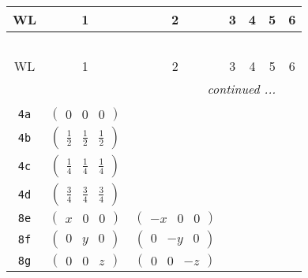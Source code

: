 \documentclass[fleqn,9pt,landscape]{jsarticle}
\begin{document}
\begin{center}
\renewcommand{\arraystretch}{1.2}
\begin{longtable}{ccccccc}
 \hline \hline
WL & 1 & 2 & 3 & 4 & 5 & 6 \\ \hline \endfirsthead

\multicolumn{6}{l}{\tablename\ \thetable{}} \\
 \hline \hline
WL & 1 & 2 & 3 & 4 & 5 & 6 \\ \hline \endhead

 \hline \hline
\multicolumn{6}{r}{\footnotesize\it continued ...} \\ \endfoot

 \hline \hline
\multicolumn{6}{r}{} \\ \endlastfoot

{\tt 4a} & $ \begin{pmatrix} 0 & 0 & 0 \end{pmatrix} $ & $  $ & $  $ & $  $ \\ \hline
{\tt 4b} & $ \begin{pmatrix} \frac{1}{2} & \frac{1}{2} & \frac{1}{2} \end{pmatrix} $ & $  $ & $  $ & $  $ \\ \hline
{\tt 4c} & $ \begin{pmatrix} \frac{1}{4} & \frac{1}{4} & \frac{1}{4} \end{pmatrix} $ & $  $ & $  $ & $  $ \\ \hline
{\tt 4d} & $ \begin{pmatrix} \frac{3}{4} & \frac{3}{4} & \frac{3}{4} \end{pmatrix} $ & $  $ & $  $ & $  $ \\ \hline
{\tt 8e} & $ \begin{pmatrix} x & 0 & 0 \end{pmatrix} $ & $ \begin{pmatrix} - x & 0 & 0 \end{pmatrix} $ & $  $ & $  $ \\ \hline
{\tt 8f} & $ \begin{pmatrix} 0 & y & 0 \end{pmatrix} $ & $ \begin{pmatrix} 0 & - y & 0 \end{pmatrix} $ & $  $ & $  $ \\ \hline
{\tt 8g} & $ \begin{pmatrix} 0 & 0 & z \end{pmatrix} $ & $ \begin{pmatrix} 0 & 0 & - z \end{pmatrix} $ & $  $ & $  $ \\ \hline

\end{longtable}
\end{center}
\end{document}
